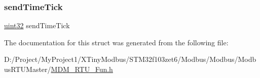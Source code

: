 \mbox{\label{struct_p_modbus___r_t_u___c_b_a01142fa006a4422cbaa461d855616d9d}} 
\subsubsection{\texorpdfstring{send\+Time\+Tick}{sendTimeTick}}
{\footnotesize\ttfamily \mbox{\hyperlink{_m_d___r_t_u___type_8h_a1134b580f8da4de94ca6b1de4d37975e}{uint32}} send\+Time\+Tick}



The documentation for this struct was generated from the following file\+:\begin{DoxyCompactItemize}
\item 
D\+:/\+Project/\+My\+Project1/\+X\+Tiny\+Modbus/\+S\+T\+M32f103zet6/\+Modbus/\+Modbus/\+Modbus\+R\+T\+U\+Master/\mbox{\hyperlink{_m_d_m___r_t_u___fun_8h}{M\+D\+M\+\_\+\+R\+T\+U\+\_\+\+Fun.\+h}}\end{DoxyCompactItemize}
